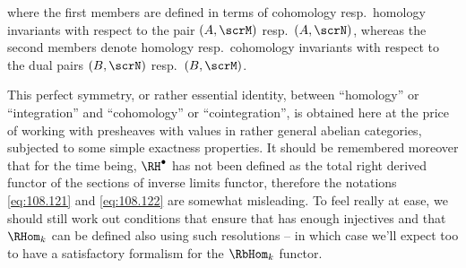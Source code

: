 where the first members are defined in terms of cohomology resp.\
homology invariants with respect to the pair $(A,\scrM)$ resp.\
$(A,\scrN)$, whereas the second members denote homology resp.\
cohomology invariants with respect to the dual pairs $(B,\scrN)$
resp.\ $(B,\scrM)$.
\begin{remarks}
  This perfect symmetry, or rather essential identity, between
  ``homology'' or ``integration'' and ``cohomology'' or
  ``cointegration'', is obtained here at the price of working with
  presheaves with values in rather general abelian categories,
  subjected to some simple exactness properties. It should be
  remembered moreover that for the time being, $\RH^\bullet$ has not
  been defined as the total right derived functor of the sections of
  inverse limits functor, therefore the notations \eqref{eq:108.121}
  and \eqref{eq:108.122} are somewhat misleading. To feel really at
  ease, we should still work out conditions that ensure that \AhatM{}
  has enough injectives and that $\RHom_k$ can be defined also using
  such resolutions -- in which case we'll expect too to have a
  satisfactory formalism for the $\RbHom_k$ functor.
\end{remarks}

\bigbreak
\presectionfill{}\par

